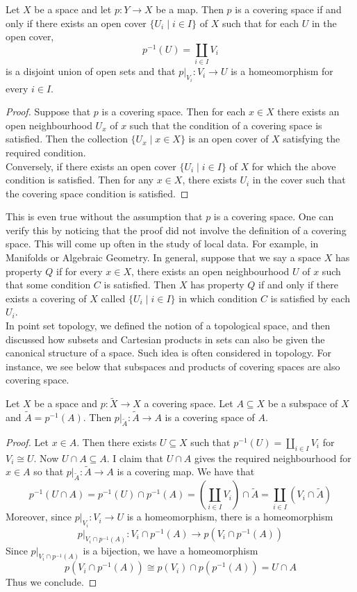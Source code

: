 \documentclass[a4paper]{article}
\begin{document}
\begin{prp}{}{} Let $X$ be a space and let $p:Y\to X$ be a map. Then $p$ is a covering space if and only if there exists an open cover $\{U_i\;|\;i\in I\}$ of $X$ such that for each $U$ in the open cover, $$p^{-1}(U)=\coprod_{i\in I}V_i$$ is a disjoint union of open sets and that $p|_{V_i}:V_i\to U$ is a homeomorphism for every $i\in I$. 
\begin{proof}
Suppose that $p$ is a covering space. Then for each $x\in X$ there exists an open neighbourhood $U_x$ of $x$ such that the condition of a covering space is satisfied. Then the collection $\{U_x\;|\;x\in X\}$ is an open cover of $X$ satisfying the required condition. \\

Conversely, if there exists an open cover $\{U_i\;|\;i\in I\}$ of $X$ for which the above condition is satisfied. Then for any $x\in X$, there exists $U_i$ in the cover such that the covering space condition is satisfied. 
\end{proof}
\end{prp}

This is even true without the assumption that $p$ is a covering space. One can verify this by noticing that the proof did not involve the definition of a covering space. This will come up often in the study of local data. For example, in Manifolds or Algebraic Geometry. In general, suppose that we say a space $X$ has property $Q$ if for every $x\in X$, there exists an open neighbourhood $U$ of $x$ such that some condition $C$ is satisfied. Then $X$ has property $Q$ if and only if there exists a covering of $X$ called $\{U_i\;|\;i\in I\}$ in which condition $C$ is satisfied by each $U_i$. \\

In point set topology, we defined the notion of a topological space, and then discussed how subsets and Cartesian products in sets can also be given the canonical structure of a space. Such idea is often considered in topology. For instance, we see below that subspaces and products of covering spaces are also covering space. 

\begin{prp}{}{} Let $X$ be a space and $p:\widetilde{X}\to X$ a covering space. Let $A\subseteq X$ be a subspace of $X$ and $\widetilde{A}=p^{-1}(A)$. Then $p|_{\widetilde{A}}:\widetilde{A}\to A$ is a covering space of $A$. 
\begin{proof}
Let $x\in A$. Then there exists $U\subseteq X$ such that $p^{-1}(U)=\coprod_{i\in I}V_i$ for $V_i\cong U$. Now $U\cap A\subseteq A$. I claim that $U\cap A$ gives the required neighbourhood for $x\in A$ so that $p|_{\widetilde{A}}:\widetilde{A}\to A$ is a covering map. We have that $$p^{-1}(U\cap A)=p^{-1}(U)\cap p^{-1}(A)=\left(\coprod_{i\in I}V_i\right)\cap\widetilde{A}=\coprod_{i\in I}(V_i\cap\widetilde{A})$$ Moreover, since $p|_{V_i}:V_i\to U$ is a homeomorphism, there is a homeomorphism $$p|_{V_i\cap p^{-1}(A)}:V_i\cap p^{-1}(A)\to p(V_i\cap p^{-1}(A))$$ Since $p|_{V_i\cap p^{-1}(A)}$ is a bijection, we have a homeomorphism $$p(V_i\cap p^{-1}(A))\cong p(V_i)\cap p(p^{-1}(A))=U\cap A$$ Thus we conclude. 
\end{proof}
\end{prp}
\end{document}
